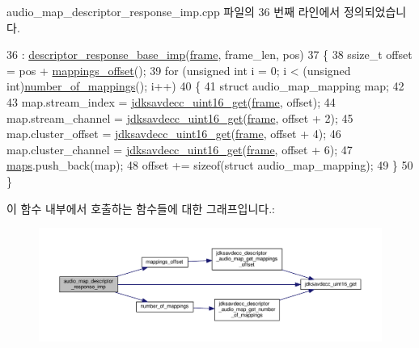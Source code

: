 audio\+\_\+map\+\_\+descriptor\+\_\+response\+\_\+imp.\+cpp 파일의 36 번째 라인에서 정의되었습니다.


\begin{DoxyCode}
36                                                                                                            
                    : \hyperlink{classavdecc__lib_1_1descriptor__response__base__imp_aa0e141f3841a15351ed63602ca2e6291}{descriptor\_response\_base\_imp}(\hyperlink{gst__avb__playbin_8c_ac8e710e0b5e994c0545d75d69868c6f0}{frame}, frame\_len, pos)
37 \{
38     ssize\_t offset = pos + \hyperlink{classavdecc__lib_1_1audio__map__descriptor__response__imp_ae7b742f5e68310753dac37037e25746f}{mappings\_offset}();
39     \textcolor{keywordflow}{for} (\textcolor{keywordtype}{unsigned} \textcolor{keywordtype}{int} i = 0; i < (\textcolor{keywordtype}{unsigned} int)\hyperlink{classavdecc__lib_1_1audio__map__descriptor__response__imp_ae2bf500862519a98450af5a447a1529d}{number\_of\_mappings}(); i++)
40     \{
41         \textcolor{keyword}{struct }audio\_map\_mapping map;
42 
43         map.stream\_index = \hyperlink{group__endian_ga3fbbbc20be954aa61e039872965b0dc9}{jdksavdecc\_uint16\_get}(\hyperlink{gst__avb__playbin_8c_ac8e710e0b5e994c0545d75d69868c6f0}{frame}, offset);
44         map.stream\_channel = \hyperlink{group__endian_ga3fbbbc20be954aa61e039872965b0dc9}{jdksavdecc\_uint16\_get}(\hyperlink{gst__avb__playbin_8c_ac8e710e0b5e994c0545d75d69868c6f0}{frame}, offset + 2);
45         map.cluster\_offset = \hyperlink{group__endian_ga3fbbbc20be954aa61e039872965b0dc9}{jdksavdecc\_uint16\_get}(\hyperlink{gst__avb__playbin_8c_ac8e710e0b5e994c0545d75d69868c6f0}{frame}, offset + 4);
46         map.cluster\_channel = \hyperlink{group__endian_ga3fbbbc20be954aa61e039872965b0dc9}{jdksavdecc\_uint16\_get}(\hyperlink{gst__avb__playbin_8c_ac8e710e0b5e994c0545d75d69868c6f0}{frame}, offset + 6);
47         \hyperlink{classavdecc__lib_1_1audio__map__descriptor__response__imp_abab36d4d2ed4dc7caed24d72f0806a83}{maps}.push\_back(map);
48         offset += \textcolor{keyword}{sizeof}(\textcolor{keyword}{struct }audio\_map\_mapping);
49     \}
50 \}
\end{DoxyCode}


이 함수 내부에서 호출하는 함수들에 대한 그래프입니다.\+:
\nopagebreak
\begin{figure}[H]
\begin{center}
\leavevmode
\includegraphics[width=350pt]{classavdecc__lib_1_1audio__map__descriptor__response__imp_a5dd7433c8db5b0be9f62bc1c58ff3279_cgraph}
\end{center}
\end{figure}


